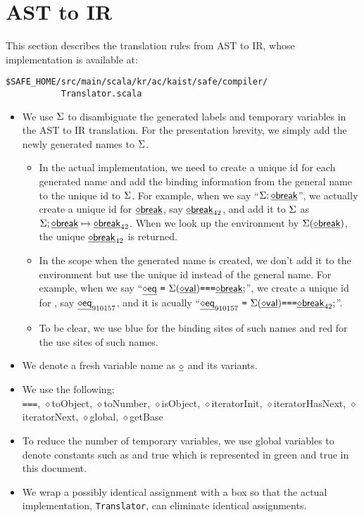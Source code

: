 \chapter{AST to IR}
This section describes the \safe translation rules from AST to IR,
whose implementation is available at:
\begin{verbatim}
$SAFE_HOME/src/main/scala/kr/ac/kaist/safe/compiler/
           Translator.scala
\end{verbatim}

\begin{itemize}
\item We use $\Sigma$ to disambiguate the generated labels and temporary variables in the AST to IR translation.
For the presentation brevity, we simply add the newly generated names to $\Sigma$.
\begin{itemize}
\item In the actual implementation, we need to create a unique id for each generated name and
add the binding information from the general name to the unique id to $\Sigma$.
For example, when we say ``$\Sigma; \underline{\sf \diamond{break}}$'',
we actually create a unique id for $\underline{\sf \diamond{break}}$, say $\underline{\sf \diamond{break}}_{42}$, and add it to $\Sigma$ as $\Sigma; \underline{\sf \diamond{break}} \mapsto \underline{\sf \diamond{break}}_{42}$.
When we look up the environment by $\Sigma(\underline{\sf \diamond{break}})$, the unique $\underline{\sf \diamond{break}}_{42}$ is returned.
\item In the scope when the generated name is created, we don't add it to the environment but use the unique id instead of the general name.
For example, when we say ``$\newvar{eq}\ \verb+=+\ \env(\newvar{val}) \verb+===+ \newvar{break};$'',
we create a unique id for , say $\underline{\sf \diamond{eq}}_{910157}$, and it is acually
``$\newvar{eq}_{910157}\ \verb+=+\ \env(\newvar{val}) \verb+===+ \newvar{break}_{42};$''.
\item To be clear, we use blue for the binding sites of such names and red for the use sites of such names.
\end{itemize}
\item We denote a fresh variable name as $\underline{\sf \diamond{}}$ and its variants.
\item We use the following:\\
\verb+===+, {\sf \ensuremath{\diamond}toObject}, {\sf \ensuremath{\diamond}toNumber}, {\sf \ensuremath{\diamond}isObject},
{\sf \ensuremath{\diamond}iteratorInit}, {\sf \ensuremath{\diamond}iteratorHasNext}, {\sf \ensuremath{\diamond}iteratorNext},
{\sf \ensuremath{\diamond}global}, {\sf \ensuremath{\diamond}getBase}
\item To reduce the number of temporary variables, we use global variables to denote constants such as {} and
{\sf true} which is represented in green {\ingreen{}} and  {\ingreen\sf true} in this document.
\item We wrap a possibly identical assignment with a box so that the actual implementation, {\tt Translator}, can eliminate identical assignments.
\end{itemize}

